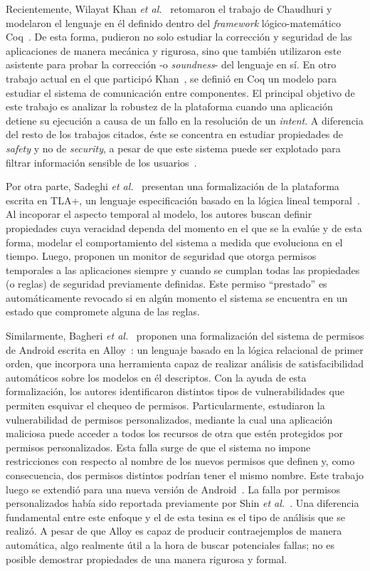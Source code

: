Recientemente, Wilayat Khan \textit{et al.}~\cite{khan} retomaron el trabajo de
Chaudhuri y modelaron el lenguaje en él definido dentro del \textit{framework}
lógico-matemático Coq~\cite{coq}. De esta forma, pudieron no solo estudiar la
corrección y seguridad de las aplicaciones de manera mecánica y rigurosa, sino
que también utilizaron este asistente para probar la corrección -o
\textit{soundness}- del lenguaje en sí. En otro trabajo actual en el que
participó Khan~\cite{crashsafe}, se definió en Coq un modelo para estudiar el
sistema de comunicación entre componentes. El principal objetivo de este trabajo
es analizar la robustez de la plataforma cuando una aplicación detiene su
ejecución a causa de un fallo en la resolución de un \textit{intent}. A
diferencia del resto de los trabajos citados, éste se concentra en estudiar
propiedades de \textit{safety} y no de \textit{security}, a pesar de que este
sistema puede ser explotado para filtrar información sensible de los
usuarios~\cite{iccta}.

Por otra parte, Sadeghi \textit{et al.}~\cite{sadeghi-temp} presentan una
formalización de la plataforma escrita en TLA+, un lenguaje especificación
basado en la lógica lineal temporal~\cite{tla+}. Al incoporar el aspecto
temporal al modelo, los autores buscan definir propiedades cuya veracidad
dependa del momento en el que se la evalúe y de esta forma, modelar el
comportamiento del sistema a medida que evoluciona en el tiempo. Luego, proponen
un monitor de seguridad que otorga permisos temporales a las aplicaciones
siempre y cuando se cumplan todas las propiedades (o reglas) de seguridad
previamente definidas. Este permiso ``prestado'' es automáticamente revocado si
en algún momento el sistema se encuentra en un estado que compromete alguna de
las reglas.

Similarmente, Bagheri \textit{et al.}~\cite{bagheri15} proponen una
formalización del sistema de permisos de Android escrita en Alloy~\cite{alloy}:
un lenguaje basado en la lógica relacional de primer orden, que incorpora una
herramienta capaz de realizar análisis de satisfacibilidad automáticos sobre los
modelos en él descriptos. Con la ayuda de esta formalización, los autores
identificaron distintos tipos de vulnerabilidades que permiten esquivar el
chequeo de permisos. Particularmente, estudiaron la vulnerabilidad de permisos
personalizados, mediante la cual una aplicación maliciosa puede acceder a todos
los recursos de otra que estén protegidos por permisos personalizados. Esta
falla surge de que el sistema no impone restricciones con respecto al nombre de
los nuevos permisos que definen y, como consecuencia, dos permisos distintos
podrían tener el mismo nombre. Este trabajo luego se extendió para una nueva
versión de Android~\cite{bagheri}. La falla por permisos personalizados había
sido reportada previamente por Shin \textit{et al.}~\cite{shin-custom}. Una
diferencia fundamental entre este enfoque y el de esta tesina es el tipo de
análisis que se realizó. A pesar de que Alloy es capaz de producir
contraejemplos de manera automática, algo realmente útil a la hora de buscar
potenciales fallas; no es posible demostrar propiedades de una manera rigurosa y
formal.

